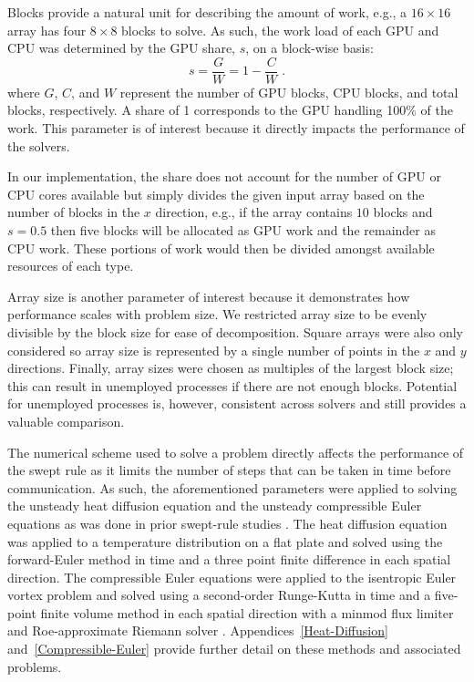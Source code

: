 \documentclass[preprints,article,accept,moreauthors,pdftex]{Definitions/mdpi}
\begin{document}
Blocks provide a natural unit for describing the amount of work, e.g., a $16\times16$ array has four $8\times8$ blocks to solve. As such, the work load of each GPU and CPU was determined by the GPU share, $s$, on a block-wise basis:  
\begin{equation}
    \label{share-equation}
    s = \frac{G}{W} = 1-\frac{C}{W} \;.
\end{equation}
where $G$, $C$, and $W$ represent the number of GPU blocks, CPU blocks, and total blocks, respectively. 
A share of 1 corresponds to the GPU handling 100\% of the work.
This parameter is of interest because it directly impacts the performance of the solvers.

In our implementation, the share does not account for the number of GPU or CPU cores available but simply divides the given input array based on the number of blocks in the $x$ direction, e.g., if the array contains $10$ blocks and $s=0.5$ then five blocks will be allocated as GPU work and the remainder as CPU work. These portions of work would then be divided amongst available resources of each type. 

Array size is another parameter of interest because it demonstrates how performance scales with problem size. We restricted array size to be evenly divisible by the block size for ease of decomposition. Square arrays were also only considered so array size is represented by a single number of points in the $x$ and $y$ directions. Finally, array sizes were chosen as multiples of the largest block size; this can result in unemployed processes if there are not enough blocks. Potential for unemployed processes is, however, consistent across solvers and still provides a valuable comparison.

The numerical scheme used to solve a problem directly affects the performance of the swept rule as it limits the number of steps that can be taken in time before communication. As such, the aforementioned parameters were applied to solving the unsteady heat diffusion equation and the unsteady compressible Euler equations as was done in prior swept-rule studies \cite{Alhubail2016ThePDEs,Alhubail2018ThePDEs,Magee2018AcceleratingDecomposition, Magee2020ApplyingSystems}. The heat diffusion equation was applied to a temperature distribution on a flat plate and solved using the forward-Euler method in time and a three point finite difference in each spatial direction. The compressible Euler equations were applied to the isentropic Euler vortex problem and solved using a second-order Runge-Kutta in time and a five-point finite volume method in each spatial direction with a minmod flux limiter and Roe-approximate Riemann solver \cite{SpiegelAMethods,Leveque2002FiniteProblems}. Appendices~\ref{Heat-Diffusion} and~\ref{Compressible-Euler} provide further detail on these methods and associated problems.
\end{document}
